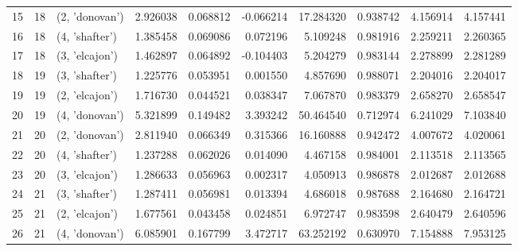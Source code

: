 \begin{tabular}{lrlrrrrrrr}
15 &     18 &  (2, 'donovan') &  2.926038 &  0.068812 & -0.066214 &  17.284320 &  0.938742 &  4.156914 &  4.157441 \\
16 &     18 &  (4, 'shafter') &  1.385458 &  0.069086 &  0.072196 &   5.109248 &  0.981916 &  2.259211 &  2.260365 \\
17 &     18 &  (3, 'elcajon') &  1.462897 &  0.064892 & -0.104403 &   5.204279 &  0.983144 &  2.278899 &  2.281289 \\
18 &     19 &  (3, 'shafter') &  1.225776 &  0.053951 &  0.001550 &   4.857690 &  0.988071 &  2.204016 &  2.204017 \\
19 &     19 &  (2, 'elcajon') &  1.716730 &  0.044521 &  0.038347 &   7.067870 &  0.983379 &  2.658270 &  2.658547 \\
20 &     19 &  (4, 'donovan') &  5.321899 &  0.149482 &  3.393242 &  50.464540 &  0.712974 &  6.241029 &  7.103840 \\
21 &     20 &  (2, 'donovan') &  2.811940 &  0.066349 &  0.315366 &  16.160888 &  0.942472 &  4.007672 &  4.020061 \\
22 &     20 &  (4, 'shafter') &  1.237288 &  0.062026 &  0.014090 &   4.467158 &  0.984001 &  2.113518 &  2.113565 \\
23 &     20 &  (3, 'elcajon') &  1.286633 &  0.056963 &  0.002317 &   4.050913 &  0.986878 &  2.012687 &  2.012688 \\
24 &     21 &  (3, 'shafter') &  1.287411 &  0.056981 &  0.013394 &   4.686018 &  0.987688 &  2.164680 &  2.164721 \\
25 &     21 &  (2, 'elcajon') &  1.677561 &  0.043458 &  0.024851 &   6.972747 &  0.983598 &  2.640479 &  2.640596 \\
26 &     21 &  (4, 'donovan') &  6.085901 &  0.167799 &  3.472717 &  63.252192 &  0.630970 &  7.154888 &  7.953125 \\
\bottomrule
\end{tabular}
